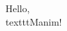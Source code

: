 \documentclass[preview]{standalone}
\begin{document}
\begin{center}
Hello, \\texttt{Manim}!
\end{center}
\end{document}

